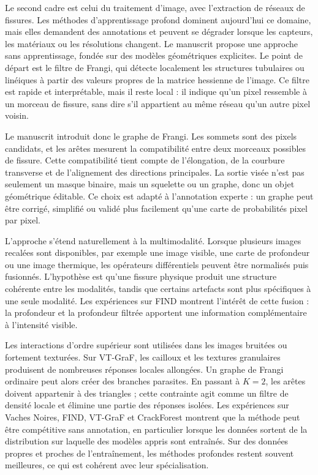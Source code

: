 Le second cadre est celui du traitement d'image, avec l'extraction de réseaux de fissures. Les méthodes d'apprentissage profond dominent aujourd'hui ce domaine, mais elles demandent des annotations et peuvent se dégrader lorsque les capteurs, les matériaux ou les résolutions changent. Le manuscrit propose une approche sans apprentissage, fondée sur des modèles géométriques explicites. Le point de départ est le filtre de Frangi, qui détecte localement les structures tubulaires ou linéiques à partir des valeurs propres de la matrice hessienne de l'image. Ce filtre est rapide et interprétable, mais il reste local : il indique qu'un pixel ressemble à un morceau de fissure, sans dire s'il appartient au même réseau qu'un autre pixel voisin.

Le manuscrit introduit donc le graphe de Frangi. Les sommets sont des pixels candidats, et les arêtes mesurent la compatibilité entre deux morceaux possibles de fissure. Cette compatibilité tient compte de l'élongation, de la courbure transverse et de l'alignement des directions principales. La sortie visée n'est pas seulement un masque binaire, mais un squelette ou un graphe, donc un objet géométrique éditable. Ce choix est adapté à l'annotation experte : un graphe peut être corrigé, simplifié ou validé plus facilement qu'une carte de probabilités pixel par pixel.

L'approche s'étend naturellement à la multimodalité. Lorsque plusieurs images recalées sont disponibles, par exemple une image visible, une carte de profondeur ou une image thermique, les opérateurs différentiels peuvent être normalisés puis fusionnés. L'hypothèse est qu'une fissure physique produit une structure cohérente entre les modalités, tandis que certains artefacts sont plus spécifiques à une seule modalité. Les expériences sur FIND montrent l'intérêt de cette fusion : la profondeur et la profondeur filtrée apportent une information complémentaire à l'intensité visible.

Les interactions d'ordre supérieur sont utilisées dans les images bruitées ou fortement texturées. Sur VT-GraF, les cailloux et les textures granulaires produisent de nombreuses réponses locales allongées. Un graphe de Frangi ordinaire peut alors créer des branches parasites. En passant à $K=2$, les arêtes doivent appartenir à des triangles ; cette contrainte agit comme un filtre de densité locale et élimine une partie des réponses isolées. Les expériences sur Vaches Noires, FIND, VT-GraF et CrackForest montrent que la méthode peut être compétitive sans annotation, en particulier lorsque les données sortent de la distribution sur laquelle des modèles appris sont entraînés. Sur des données propres et proches de l'entraînement, les méthodes profondes restent souvent meilleures, ce qui est cohérent avec leur spécialisation.

